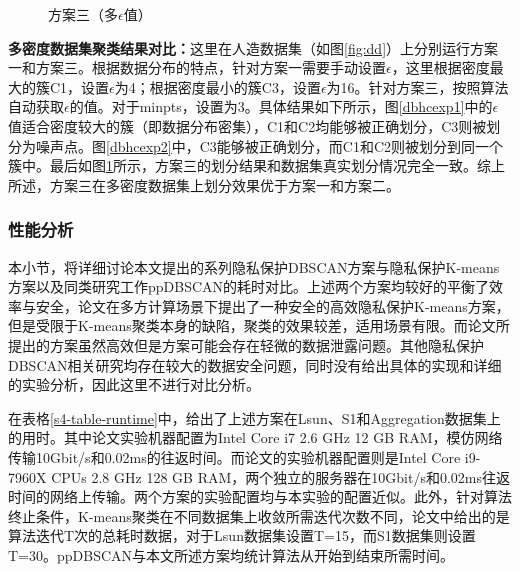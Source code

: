 \begin{figure}[htbp]
\begin{minipage}[t]{0.33\linewidth}
		\caption{方案三（多$ \epsilon $值）}
		\label{dbhcexp3}
	\end{minipage}
\end{figure}

\textbf{多密度数据集聚类结果对比：}这里在人造数据集（如图\ref{fig:dd}）上分别运行方案一和方案三。根据数据分布的特点，针对方案一需要手动设置$ \epsilon $，这里根据密度最大的簇C1，设置$ \epsilon $为4；根据密度最小的簇C3，设置$ \epsilon $为16。针对方案三，按照算法自动获取$ \epsilon $的值。对于minpts，设置为3。具体结果如下所示，图\ref{dbhcexp1}中的$ \epsilon $值适合密度较大的簇（即数据分布密集），C1和C2均能够被正确划分，C3则被划分为噪声点。图\ref{dbhcexp2}中，C3能够被正确划分，而C1和C2则被划分到同一个簇中。最后如图\ref{dbhcexp3}所示，方案三的划分结果和数据集真实划分情况完全一致。综上所述，方案三在多密度数据集上划分效果优于方案一和方案二。


\subsubsection{性能分析}
本小节，将详细讨论本文提出的系列隐私保护DBSCAN方案与隐私保护K-means方案\cite{mohassel2019practical}以及同类研究工作ppDBSCAN\cite{bozdemir2021privacy}的耗时对比。上述两个方案均较好的平衡了效率与安全，论文\cite{mohassel2019practical}在多方计算场景下提出了一种安全的高效隐私保护K-means方案，但是受限于K-means聚类本身的缺陷，聚类的效果较差，适用场景有限。而论文\cite{bozdemir2021privacy}所提出的方案虽然高效但是方案可能会存在轻微的数据泄露问题。其他隐私保护DBSCAN相关研究均存在较大的数据安全问题，同时没有给出具体的实现和详细的实验分析，因此这里不进行对比分析。

在表格\ref{s4-table-runtime}中，给出了上述方案在Lsun、S1和Aggregation数据集上的用时。其中论文\cite{mohassel2019practical}实验机器配置为Intel Core i7 2.6 GHz 12 GB RAM，模仿网络传输10Gbit/s和0.02ms的往返时间。而论文\cite{bozdemir2021privacy}的实验机器配置则是Intel Core i9-7960X CPUs 2.8 GHz 128 GB RAM，两个独立的服务器在10Gbit/s和0.02ms往返时间的网络上传输。两个方案的实验配置均与本实验的配置近似。此外，针对算法终止条件，K-means聚类在不同数据集上收敛所需迭代次数不同，论文\cite{mohassel2019practical}中给出的是算法迭代T次的总耗时数据，对于Lsun数据集设置T=15，而S1数据集则设置T=30。ppDBSCAN\cite{bozdemir2021privacy}与本文所述方案均统计算法从开始到结束所需时间。

